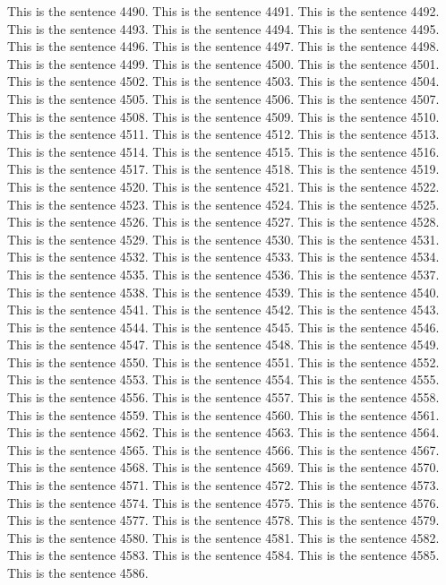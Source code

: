 \documentclass{article}
\begin{document}
This is the sentence 4490.
This is the sentence 4491.
This is the sentence 4492.
This is the sentence 4493.
This is the sentence 4494.
This is the sentence 4495.
This is the sentence 4496.
This is the sentence 4497.
This is the sentence 4498.
This is the sentence 4499.
This is the sentence 4500.
This is the sentence 4501.
This is the sentence 4502.
This is the sentence 4503.
This is the sentence 4504.
This is the sentence 4505.
This is the sentence 4506.
This is the sentence 4507.
This is the sentence 4508.
This is the sentence 4509.
This is the sentence 4510.
This is the sentence 4511.
This is the sentence 4512.
This is the sentence 4513.
This is the sentence 4514.
This is the sentence 4515.
This is the sentence 4516.
This is the sentence 4517.
This is the sentence 4518.
This is the sentence 4519.
This is the sentence 4520.
This is the sentence 4521.
This is the sentence 4522.
This is the sentence 4523.
This is the sentence 4524.
This is the sentence 4525.
This is the sentence 4526.
This is the sentence 4527.
This is the sentence 4528.
This is the sentence 4529.
This is the sentence 4530.
This is the sentence 4531.
This is the sentence 4532.
This is the sentence 4533.
This is the sentence 4534.
This is the sentence 4535.
This is the sentence 4536.
This is the sentence 4537.
This is the sentence 4538.
This is the sentence 4539.
This is the sentence 4540.
This is the sentence 4541.
This is the sentence 4542.
This is the sentence 4543.
This is the sentence 4544.
This is the sentence 4545.
This is the sentence 4546.
This is the sentence 4547.
This is the sentence 4548.
This is the sentence 4549.
This is the sentence 4550.
This is the sentence 4551.
This is the sentence 4552.
This is the sentence 4553.
This is the sentence 4554.
This is the sentence 4555.
This is the sentence 4556.
This is the sentence 4557.
This is the sentence 4558.
This is the sentence 4559.
This is the sentence 4560.
This is the sentence 4561.
This is the sentence 4562.
This is the sentence 4563.
This is the sentence 4564.
This is the sentence 4565.
This is the sentence 4566.
This is the sentence 4567.
This is the sentence 4568.
This is the sentence 4569.
This is the sentence 4570.
This is the sentence 4571.
This is the sentence 4572.
This is the sentence 4573.
This is the sentence 4574.
This is the sentence 4575.
This is the sentence 4576.
This is the sentence 4577.
This is the sentence 4578.
This is the sentence 4579.
This is the sentence 4580.
This is the sentence 4581.
This is the sentence 4582.
This is the sentence 4583.
This is the sentence 4584.
This is the sentence 4585.
This is the sentence 4586.
\end{document}
